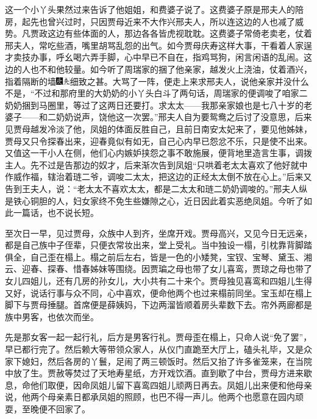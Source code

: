 这一个小丫头果然过来告诉了他姐姐，和费婆子说了。这费婆子原是邢夫人的陪房，起先也曾兴过时，只因贾母近来不大作兴邢夫人，所以连这边的人也减了威势。凡贾政这边有些体面的人，那边各各皆虎视耽耽。这费婆子常倚老卖老，仗着邢夫人，常吃些酒，嘴里胡骂乱怨的出气。如今贾母庆寿这样大事，干看着人家逞才卖技办事，呼幺喝六弄手脚，心中早已不自在，指鸡骂狗，闲言闲语的乱闹。这边的人也不和他较量。如今听了周瑞家的捆了他亲家，越发火上浇油，仗着酒兴，指着隔断的墙{\includegraphics[width=3mm]{../Images/00004}\includegraphics[width=3mm]{../Images/00012}\footnotesize \kaishu 细致之甚。}大骂了一阵，便走上来求邢夫人，说他亲家并没什么不是，“不过和那府里的大奶奶的小丫头白斗了两句话，周瑞家的便调唆了咱家二奶奶捆到马圈里，等过了这两日还要打。求太太------我那亲家娘也是七八十岁的老婆子------和二奶奶说声，饶他这一次罢。”邢夫人自为要鸳鸯之后讨了没意思，后来见贾母越发冷淡了他，凤姐的体面反胜自己，且前日南安太妃来了，要见他姊妹，贾母又只令探春出来，迎春竟似有如无，自己心内早已怨忿不乐，只是使不出来。又值这一干小人在侧，他们心内嫉妒挟怨之事不敢施展，便背地里造言生事，调拨主人。先不过是告那边的奴才，后来渐次告到凤姐“只哄着老太太喜欢了他好就中作威作福，辖治着琏二爷，调唆二太太，把这边的正经太太倒不放在心上。”后来又告到王夫人，说：“老太太不喜欢太太，都是二太太和琏二奶奶调唆的。”邢夫人纵是铁心铜胆的人，妇女家终不免生些嫌隙之心，近日因此着实恶绝凤姐。今听了如此一篇话，也不说长短。

至次日一早，见过贾母，众族中人到齐，坐席开戏。贾母高兴，又见今日无远亲，都是自己族中子侄辈，只便衣常妆出来，堂上受礼。当中独设一榻，引枕靠背脚踏俱全，自己歪在榻上。榻之前后左右，皆是一色的小矮凳，宝钗、宝琴、黛玉、湘云、迎春、探春、惜春姊妹等围绕。因贾㻞之母也带了女儿喜鸾，贾琼之母也带了女儿四姐儿，还有几房的孙女儿，大小共有二十来个。贾母独见喜鸾和四姐儿生得又好，说话行事与众不同，心中喜欢，便命他两个也过来榻前同坐。宝玉却在榻上脚下与贾母捶腿。首席便是薛姨妈，下边两溜皆顺着房头辈数下去。帘外两廊都是族中男客，也依次而坐。

先是那女客一起一起行礼，后方是男客行礼。贾母歪在榻上，只命人说“免了罢”，早已都行完了。然后赖大等带领众家人，从仪门直跪至大厅上，磕头礼毕，又是众家下媳妇，然后各房的丫鬟，足闹了两三顿饭时。然后又抬了许多雀笼来，在当院中放了生。贾赦等焚过了天地寿星纸，方开戏饮酒。直到歇了中台，贾母方进来歇息，命他们取便，因命凤姐儿留下喜鸾四姐儿顽两日再去。凤姐儿出来便和他母亲说，他两个母亲素日都承凤姐的照顾，也巴不得一声儿。他两个也愿意在园内顽耍，至晚便不回家了。

